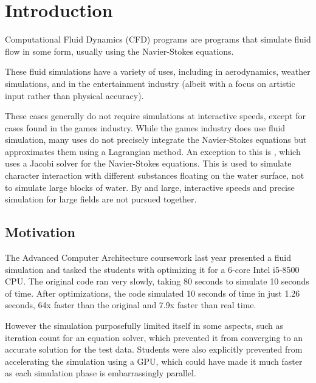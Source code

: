 
\chapter{Introduction}
\label{sec:Introduction} 
Computational Fluid Dynamics (CFD) programs are programs that simulate fluid flow in some form, usually using the Navier-Stokes equations.

These fluid simulations have a variety of uses,
including in aerodynamics,
weather simulations,
and in the entertainment industry (albeit with a focus on artistic input rather than physical accuracy\cite{article:FluidDynamicsOnBigScreen}).

These cases generally do not require simulations at interactive speeds, except for cases found in the games industry.
While the games industry does use fluid simulation\cite{paper:GameFluidSummary:medveckyreal}, many uses do not precisely integrate the Navier-Stokes equations but approximates them \cite{paper:StableFluids:10.1145/311535.311548} using a Lagrangian method.
An exception to this is \cite{presentation:RealtimeFluidSimTombRaider}, which uses a Jacobi solver for the Navier-Stokes equations. This is used to simulate character interaction with different substances floating on the water surface\cite{presentation:RealtimeFluidSimTombRaider}, not to simulate large blocks of water.
By and large, interactive speeds and precise simulation for large fields are not pursued together.

\section{Motivation}
The Advanced Computer Architecture coursework last year presented a fluid simulation and tasked the students with optimizing it for a 6-core Intel i5-8500 CPU\cite{modules:CS257Coursework}.
The original code ran very slowly, taking 80 seconds to simulate 10 seconds of time. %
After optimizations, the code simulated 10 seconds of time in just 1.26 seconds, 64x faster than the original and 7.9x faster than real time.

However the simulation purposefully limited itself in some aspects, such as iteration count for an equation solver, which prevented it from converging to an accurate solution for the test data.
Students were also explicitly prevented from accelerating the simulation using a GPU, which could have made it much faster as each simulation phase is embarrassingly parallel.

